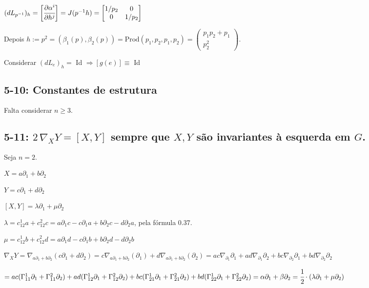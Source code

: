 \documentclass[10pt,a4paper]{article}
\begin{document}
		$(dL_{p^{-1}})_h = \bigg[\cfrac{\partial \alpha^i}{\partial h^j} \bigg] = J(p^{-1}h) = \left[ \begin{matrix} 1/p_2 & 0 \\ 0 & 1/p_2 \end{matrix} \right]$

		Depois $h := p^2 = (\beta_1(p), \beta_2(p)) = \text{Prod}(p_1,p_2,p_1,p_2) = \left( \begin{matrix} p_1 p_2 + p_1 \\ p_2^2 \end{matrix} \right)$.

		Considerar $(dL_e)_h =$ Id $\Rightarrow [g(e)] \equiv$ Id

		\subsection{5-10: Constantes de estrutura}
		\begin{flushright}
		\end{flushright}

		Falta considerar $n \ge 3$.

		\subsection{5-11: $2\, \nabla_X Y = [X, Y]$ sempre que $X, Y$ s\~ao invariantes \`a esquerda em $G$.}
		\begin{flushright}
		\end{flushright}

		Seja $n = 2$.

		$X = a \partial_1 + b \partial_2$

		$Y = c \partial_1 + d \partial_2$

		$[X, Y] = \lambda \partial_1 + \mu \partial_2$

		$\lambda = c_{12}^1a + c_{12}^2c = a \partial_1 c - c \partial_1 a + b \partial_2 c - d \partial_2 a$, pela f\'ormula 0.37.

		$\mu = c_{12}^1b + c_{12}^2d = a \partial_1 d - c \partial_1 b + b \partial_2 d - d \partial_2 b$

		$\nabla_X Y = \nabla_{a \partial_1 + b \partial_2} (c \partial_1 + d \partial_2)  = c \nabla_{a \partial_1 + b \partial_2} (\partial_1) + d \nabla_{a \partial_1 + b \partial_2} (\partial_2) = ac \nabla_{ \partial_1} \partial_1 + ad \nabla_{\partial_1} \partial_2 + bc \nabla_{\partial_2} \partial_1 + bd \nabla_{ \partial_2} \partial_2$

		$= ac(\Gamma_{11}^1 \partial_1 + \Gamma_{11}^2 \partial_2) + ad(\Gamma_{12}^1 \partial_1 + \Gamma_{12}^2 \partial_2) + bc(\Gamma_{21}^1 \partial_1 + \Gamma_{21}^2 \partial_2) + bd(\Gamma_{22}^1 \partial_1 + \Gamma_{22}^2 \partial_2) = \alpha \partial_1 + \beta \partial_2 = \cfrac{1}{2}\cdot (\lambda \partial_1 + \mu \partial_2)$
\end{document}
